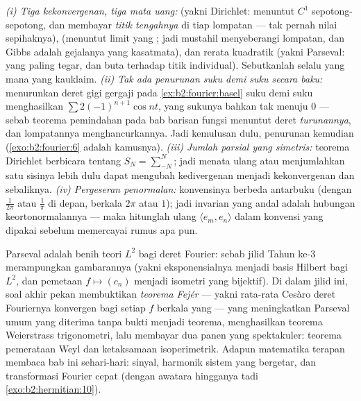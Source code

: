 \begin{remark}
\emph{(i) Tiga kekonvergenan, tiga mata uang:} 
(yakni Dirichlet: menuntut $C^1$ sepotong-sepotong, dan membayar \emph{titik tengahnya} di
tiap lompatan --- tak pernah nilai sepihaknya),  (menuntut
limit yang ; jadi mustahil menyeberangi lompatan, dan Gibbs adalah
gejalanya yang kasatmata), dan rerata kuadratik (yakni Parseval: yang paling
tegar, dan buta terhadap titik individual). Sebutkanlah selalu yang mana
yang kauklaim. \emph{(ii) Tak ada penurunan suku demi suku secara
baku:} menurunkan deret gigi gergaji pada
\cref{ex:b2:fourier:basel} suku demi suku menghasilkan $\sum
2(-1)^{n+1}\cos nt$, yang sukunya bahkan tak menuju $0$ ---
sebab teorema pemindahan pada bab barisan fungsi menuntut
 deret \emph{turunannya}, dan lompatannya
menghancurkannya. Jadi kemulusan dulu, penurunan kemudian
(\cref{exo:b2:fourier:6} adalah kamusnya). \emph{(iii)
Jumlah parsial yang simetris:} teorema Dirichlet berbicara tentang $S_N =
\sum_{-N}^{N}$; jadi menata ulang atau menjumlahkan satu sisinya lebih dulu dapat
mengubah kedivergenan menjadi kekonvergenan dan sebaliknya. \emph{(iv)
Pergeseran penormalan:} konvensinya berbeda antarbuku
(dengan $\frac{1}{2\pi}$ atau $\frac1\pi$ di depan, berkala $2\pi$ atau
$1$); jadi invarian yang andal adalah hubungan keortonormalannya
--- maka hitunglah ulang $\langle e_m, e_n\rangle$ dalam konvensi yang
dipakai sebelum memercayai rumus apa pun.
\end{remark}

\begin{remark}
Parseval adalah benih teori $L^2$ bagi deret Fourier: sebab
jilid Tahun ke-3 merampungkan gambarannya (yakni eksponensialnya menjadi
basis Hilbert bagi $L^2$, dan pemetaan $f \mapsto (c_n)$ menjadi
isometri yang bijektif). Di dalam jilid ini, soal akhir pekan
membuktikan \emph{teorema Fejér} --- yakni rata-rata Cesàro deret
Fouriernya konvergen  bagi setiap $f$ berkala yang 
--- yang meningkatkan Parseval umum yang diterima tanpa bukti menjadi
teorema, menghasilkan teorema Weierstrass trigonometri, lalu membayar
dua panen yang spektakuler: teorema pemerataan Weyl dan
ketaksamaan isoperimetrik. Adapun matematika terapan membaca bab
ini sehari-hari:  sinyal, harmonik sistem yang bergetar,
dan transformasi Fourier cepat (dengan awatara hingganya tadi
\cref{exo:b2:hermitian:10}).
\end{remark}

